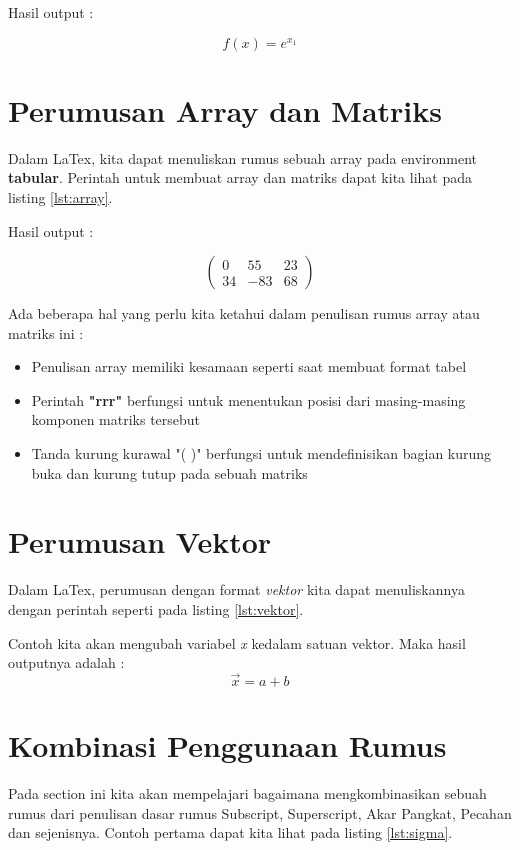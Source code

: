 Hasil output :

\begin{displaymath}
f(x) = e^{x_1}
\end{displaymath}

\section {Perumusan Array dan Matriks}
Dalam LaTex, kita dapat menuliskan rumus sebuah array pada environment \textbf{tabular}. Perintah untuk membuat array dan matriks dapat kita lihat pada listing \ref{lst:array}.


Hasil output :

\begin{displaymath}
\left (
\begin{array}{rrr}
0 & 55 & 23 \\
34 & -83 & 68 \end{array}
\right )
\end{displaymath}

Ada beberapa hal yang perlu kita ketahui dalam penulisan rumus array atau matriks ini :
\begin{itemize}
\item Penulisan array memiliki kesamaan seperti saat membuat format tabel
\item Perintah \textbf{"rrr"} berfungsi untuk menentukan posisi dari masing-masing komponen matriks tersebut
\item Tanda kurung kurawal "( )" berfungsi untuk mendefinisikan bagian kurung buka dan kurung tutup pada sebuah matriks  
\end{itemize}

\section{Perumusan Vektor}
Dalam LaTex, perumusan dengan format \textit{vektor} kita dapat menuliskannya dengan perintah seperti pada listing \ref{lst:vektor}.
 

Contoh kita akan mengubah variabel \textit{x} kedalam satuan vektor. Maka hasil outputnya adalah :
\begin{displaymath}
\vec{x} = a + b
\end{displaymath} 

\section{Kombinasi Penggunaan Rumus}
Pada section ini kita akan mempelajari bagaimana mengkombinasikan sebuah rumus dari penulisan dasar rumus Subscript, Superscript, Akar Pangkat, Pecahan dan sejenisnya. Contoh pertama dapat kita lihat pada listing \ref{lst:sigma}.


